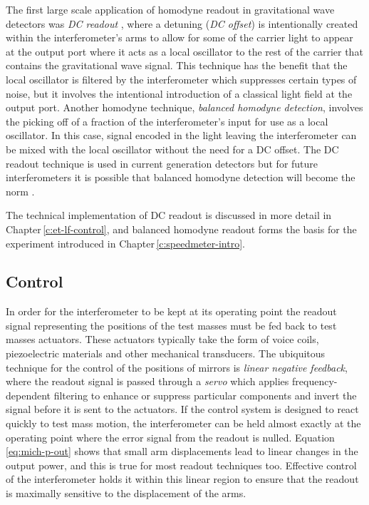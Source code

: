 The first large scale application of homodyne readout in gravitational wave detectors was \emph{\gls{DC} readout} \cite{Fricke2012}, where a detuning (\emph{\gls{DC} offset}) is intentionally created within the interferometer's arms to allow for some of the carrier light to appear at the output port where it acts as a local oscillator to the rest of the carrier that contains the gravitational wave signal. This technique has the benefit that the local oscillator is filtered by the interferometer which suppresses certain types of noise, but it involves the intentional introduction of a classical light field at the output port. Another homodyne technique, \emph{balanced homodyne detection}, involves the picking off of a fraction of the interferometer's input for use as a local oscillator. In this case, signal encoded in the light leaving the interferometer can be mixed with the local oscillator without the need for a \gls{DC} offset. The \gls{DC} readout technique is used in current generation detectors but for future interferometers it is possible that balanced homodyne detection will become the norm \cite{Gard2016}.

The technical implementation of \gls{DC} readout is discussed in more detail in Chapter\,\ref{c:et-lf-control}, and balanced homodyne readout forms the basis for the experiment introduced in Chapter\,\ref{c:speedmeter-intro}.

\subsection{Control}
In order for the interferometer to be kept at its operating point the readout signal representing the positions of the test masses must be fed back to test masses actuators. These actuators typically take the form of voice coils, piezoelectric materials and other mechanical transducers. The ubiquitous technique for the control of the positions of mirrors is \emph{linear negative feedback}, where the readout signal is passed through a \emph{servo} which applies frequency-dependent filtering to enhance or suppress particular components and invert the signal before it is sent to the actuators. If the control system is designed to react quickly to test mass motion, the interferometer can be held almost exactly at the operating point where the error signal from the readout is nulled. Equation\,\ref{eq:mich-p-out} shows that small arm displacements lead to linear changes in the output power, and this is true for most readout techniques too. Effective control of the interferometer holds it within this linear region to ensure that the readout is maximally sensitive to the displacement of the arms.

